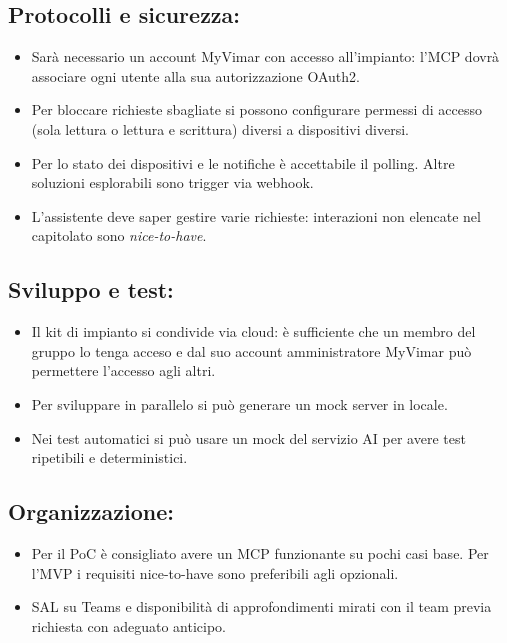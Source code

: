\documentclass[a4paper, 11pt]{article}
\begin{document}
\subsection{Protocolli e sicurezza:}
\begin{itemize}
    \item Sarà necessario un account MyVimar con accesso all'impianto: l'MCP dovrà associare ogni utente alla sua autorizzazione OAuth2. \vspace{-0.1cm}
    \item Per bloccare richieste sbagliate si possono configurare permessi di accesso (sola lettura o lettura e scrittura) diversi a dispositivi diversi. \vspace{-0.1cm}
    \item Per lo stato dei dispositivi e le notifiche è accettabile il polling. Altre soluzioni esplorabili sono trigger via webhook. \vspace{-0.1cm}
    \item L'assistente deve saper gestire varie richieste: interazioni non elencate nel capitolato sono \textit{nice-to-have}. \vspace{-0.1cm}
\end{itemize}
\subsection{Sviluppo e test:}
\begin{itemize}
    \item Il kit di impianto si condivide via cloud: è sufficiente che un membro del gruppo lo tenga acceso e dal suo account amministratore MyVimar può permettere l'accesso agli altri.\vspace{-0.1cm}
    \item Per sviluppare in parallelo si può generare un mock server in locale. \vspace{-0.1cm}
    \item Nei test automatici si può usare un mock del servizio AI per avere test ripetibili e deterministici. \vspace{-0.1cm}
\end{itemize}
\subsection{Organizzazione:}
\begin{itemize}
    \item Per il PoC è consigliato avere un MCP funzionante su pochi casi base. Per l'MVP i requisiti nice-to-have sono preferibili agli opzionali. \vspace{-0.1cm}
    \item SAL su Teams e disponibilità di approfondimenti mirati con il team previa richiesta con adeguato anticipo. \vspace{-0.1cm}
\end{itemize}
\end{document}
